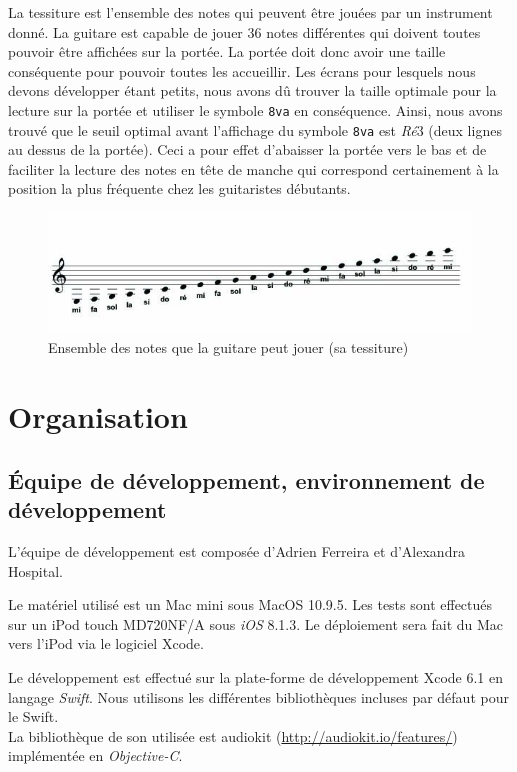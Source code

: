 \documentclass{scrreprt}
\begin{document}
La tessiture est l'ensemble des notes qui peuvent être jouées par un instrument donné.
La guitare est capable de jouer 36 notes différentes qui doivent toutes pouvoir être affichées sur la portée.
La portée doit donc avoir une taille conséquente pour pouvoir toutes les accueillir.
Les écrans pour lesquels nous devons développer étant petits, nous avons dû trouver la taille optimale pour la lecture sur la portée et utiliser le symbole \texttt{8va} en conséquence.
Ainsi, nous avons trouvé que le seuil optimal avant l'affichage du symbole \texttt{8va} est \textit{Ré}3 (deux lignes au dessus de la portée).
Ceci a pour effet d'abaisser la portée vers le bas et de faciliter la lecture des notes en tête de manche qui correspond certainement à la position la plus fréquente chez les guitaristes débutants.
\begin{figure}[!ht]
  \centering\includegraphics[width=\textwidth]{images/note_portee.jpg}
  \caption{Ensemble des notes que la guitare peut jouer (sa tessiture)}
\end{figure}
\newline

\chapter{Organisation}
\section{Équipe de développement, environnement de développement}
L'équipe de développement est composée d'Adrien Ferreira et d'Alexandra Hospital. 

Le matériel utilisé est un Mac mini sous MacOS 10.9.5. 
Les tests sont effectués sur un iPod touch MD720NF/A sous \textit{iOS} 8.1.3. Le déploiement sera fait du Mac vers l'iPod via le logiciel Xcode.

Le développement est effectué sur la plate-forme de développement Xcode 6.1 en langage \textit{Swift}.
Nous utilisons les différentes bibliothèques incluses par défaut pour le Swift. \\
La bibliothèque de son utilisée est audiokit (\url{http://audiokit.io/features/}) implémentée en \textit{Objective-C}.
\end{document}
